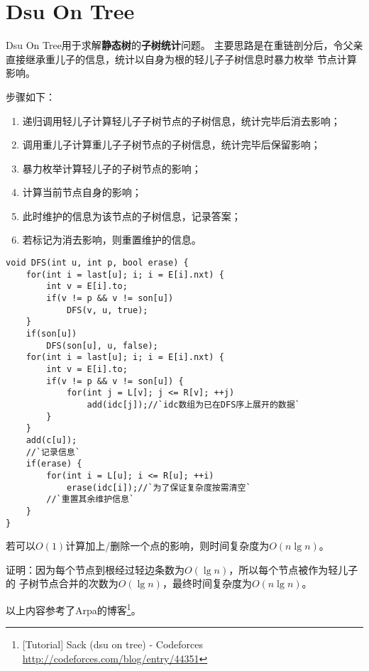 \section{Dsu On Tree}
Dsu On Tree用于求解{\bfseries 静态树}的{\bfseries 子树统计}问题。
主要思路是在重链剖分后，令父亲直接继承重儿子的信息，统计以自身为根的轻儿子子树信息时暴力枚举
节点计算影响。

步骤如下：
\begin{enumerate}
    \item 递归调用轻儿子计算轻儿子子树节点的子树信息，统计完毕后消去影响；
    \item 调用重儿子计算重儿子子树节点的子树信息，统计完毕后保留影响；
    \item 暴力枚举计算轻儿子的子树节点的影响；
    \item 计算当前节点自身的影响；
    \item 此时维护的信息为该节点的子树信息，记录答案；
    \item 若标记为消去影响，则重置维护的信息。
\end{enumerate}

\begin{lstlisting}[title=Dsu On Tree]
void DFS(int u, int p, bool erase) {
    for(int i = last[u]; i; i = E[i].nxt) {
        int v = E[i].to;
        if(v != p && v != son[u])
            DFS(v, u, true);
    }
    if(son[u])
        DFS(son[u], u, false);
    for(int i = last[u]; i; i = E[i].nxt) {
        int v = E[i].to;
        if(v != p && v != son[u]) {
            for(int j = L[v]; j <= R[v]; ++j)
                add(idc[j]);//`idc数组为已在DFS序上展开的数据`
        }
    }
    add(c[u]);
    //`记录信息`
    if(erase) {
        for(int i = L[u]; i <= R[u]; ++i)
            erase(idc[i]);//`为了保证复杂度按需清空`
        //`重置其余维护信息`
    }
}
\end{lstlisting}

若可以$O(1)$计算加上/删除一个点的影响，则时间复杂度为$O(n\lg n)$。

证明：因为每个节点到根经过轻边条数为$O(\lg n)$，所以每个节点被作为轻儿子的
子树节点合并的次数为$O(\lg n)$，最终时间复杂度为$O(n\lg n)$。

以上内容参考了Arpa的博客\footnote{[Tutorial] Sack (dsu on tree) - Codeforces
    \url{http://codeforces.com/blog/entry/44351}
}。
